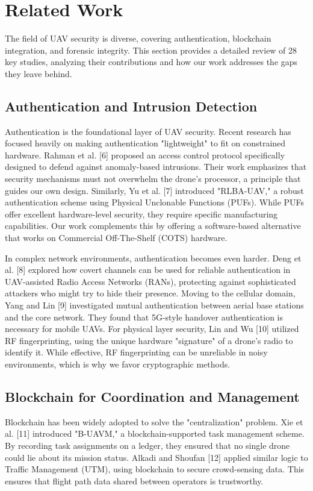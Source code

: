 \documentclass[preprint,12pt]{elsarticle}
\begin{document}
\section{Related Work}
The field of UAV security is diverse, covering authentication, blockchain integration, and forensic integrity. This section provides a detailed review of 28 key studies, analyzing their contributions and how our work addresses the gaps they leave behind.
\label{sec2}

\subsection{Authentication and Intrusion Detection}
\label{subsec2-1}

Authentication is the foundational layer of UAV security. Recent research has focused heavily on making authentication "lightweight" to fit on constrained hardware. Rahman et al. [6] proposed an access control protocol specifically designed to defend against anomaly-based intrusions. Their work emphasizes that security mechanisms must not overwhelm the drone's processor, a principle that guides our own design. Similarly, Yu et al. [7] introduced "RLBA-UAV," a robust authentication scheme using Physical Unclonable Functions (PUFs). While PUFs offer excellent hardware-level security, they require specific manufacturing capabilities. Our work complements this by offering a software-based alternative that works on Commercial Off-The-Shelf (COTS) hardware.


In complex network environments, authentication becomes even harder. Deng et al. [8] explored how covert channels can be used for reliable authentication in UAV-assisted Radio Access Networks (RANs), protecting against sophisticated attackers who might try to hide their presence. Moving to the cellular domain, Yang and Lin [9] investigated mutual authentication between aerial base stations and the core network. They found that 5G-style handover authentication is necessary for mobile UAVs. For physical layer security, Lin and Wu [10] utilized RF fingerprinting, using the unique hardware "signature" of a drone's radio to identify it. While effective, RF fingerprinting can be unreliable in noisy environments, which is why we favor cryptographic methods.

\subsection{Blockchain for Coordination and Management}
\label{subsec2-2}
Blockchain has been widely adopted to solve the "centralization" problem. Xie et al. [11] introduced "B-UAVM," a blockchain-supported task management scheme. By recording task assignments on a ledger, they ensured that no single drone could lie about its mission status. Alkadi and Shoufan [12] applied similar logic to Traffic Management (UTM), using blockchain to secure crowd-sensing data. This ensures that flight path data shared between operators is trustworthy.
\end{document}
